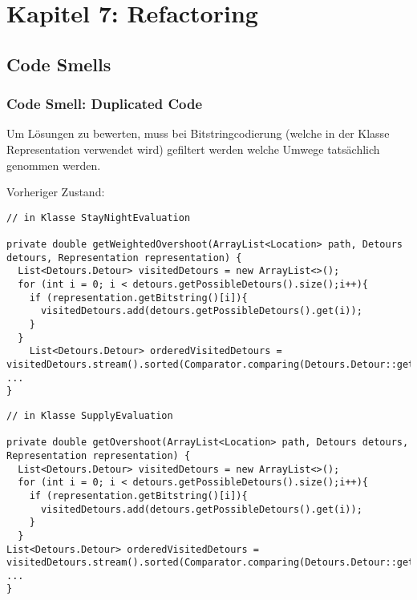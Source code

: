 \section{Kapitel 7: Refactoring}

\subsection{Code Smells}

\subsubsection{Code Smell: Duplicated Code}


Um Lösungen zu bewerten, muss bei Bitstringcodierung (welche in der Klasse Representation verwendet wird) gefiltert werden welche Umwege tatsächlich genommen werden.

Vorheriger Zustand:

\begin{lstlisting}
// in Klasse StayNightEvaluation 

private double getWeightedOvershoot(ArrayList<Location> path, Detours detours, Representation representation) {
  List<Detours.Detour> visitedDetours = new ArrayList<>();
  for (int i = 0; i < detours.getPossibleDetours().size();i++){
    if (representation.getBitstring()[i]){
      visitedDetours.add(detours.getPossibleDetours().get(i));
    }
  }
    List<Detours.Detour> orderedVisitedDetours = visitedDetours.stream().sorted(Comparator.comparing(Detours.Detour::getPosition)).toList();
...
}

\end{lstlisting}

\begin{lstlisting}
// in Klasse SupplyEvaluation 
	
private double getOvershoot(ArrayList<Location> path, Detours detours, Representation representation) {
  List<Detours.Detour> visitedDetours = new ArrayList<>();
  for (int i = 0; i < detours.getPossibleDetours().size();i++){
    if (representation.getBitstring()[i]){
      visitedDetours.add(detours.getPossibleDetours().get(i));
    }
  }
List<Detours.Detour> orderedVisitedDetours = visitedDetours.stream().sorted(Comparator.comparing(Detours.Detour::getPosition)).toList();
...	
}
	
\end{lstlisting}


